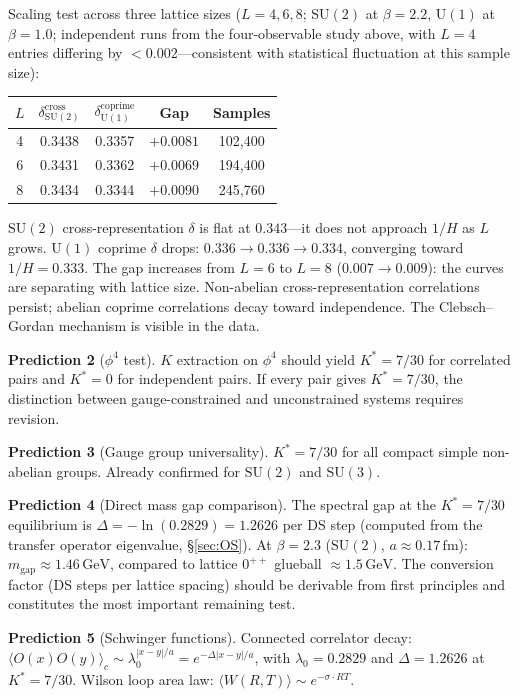 \documentclass[11pt,a4paper]{article}
\theoremstyle{definition}
\theoremstyle{remark}
\newcommand{\SU}{\mathrm{SU}}
\begin{document}
Scaling test across three lattice sizes ($L=4,6,8$; $\SU(2)$ at $\beta=2.2$, $\mathrm{U}(1)$ at $\beta=1.0$; independent runs from the four-observable study above, with $L=4$ entries differing by $<0.002$---consistent with statistical fluctuation at this sample size):

\begin{center}
\begin{tabular}{ccccc}
\toprule
$L$ & $\delta_{\SU(2)}^{\mathrm{cross}}$ & $\delta_{\mathrm{U}(1)}^{\mathrm{coprime}}$ & Gap & Samples \\
\midrule
4 & 0.3438 & 0.3357 & $+0.0081$ & 102{,}400 \\
6 & 0.3431 & 0.3362 & $+0.0069$ & 194{,}400 \\
8 & 0.3434 & 0.3344 & $+0.0090$ & 245{,}760 \\
\bottomrule
\end{tabular}
\end{center}

$\SU(2)$ cross-representation $\delta$ is flat at $0.343$---it does not approach $1/H$ as $L$ grows. $\mathrm{U}(1)$ coprime $\delta$ drops: $0.336\to 0.336\to 0.334$, converging toward $1/H=0.333$. The gap increases from $L=6$ to $L=8$ ($0.007\to 0.009$): the curves are separating with lattice size. Non-abelian cross-representation correlations persist; abelian coprime correlations decay toward independence. The Clebsch--Gordan mechanism is visible in the data.

\textbf{Prediction 2} ($\phi^4$ test). $K$ extraction on $\phi^4$ should yield $K^*=7/30$ for correlated pairs and $K^*=0$ for independent pairs. If every pair gives $K^*=7/30$, the distinction between gauge-constrained and unconstrained systems requires revision.

\textbf{Prediction 3} (Gauge group universality). $K^*=7/30$ for all compact simple non-abelian groups. Already confirmed for $\SU(2)$ and $\SU(3)$.

\textbf{Prediction 4} (Direct mass gap comparison). The spectral gap at the $K^*=7/30$ equilibrium is $\Delta=-\ln(0.2829)=1.2626$ per DS step (computed from the transfer operator eigenvalue, \S\ref{sec:OS}). At $\beta=2.3$ ($\SU(2)$, $a\approx 0.17\,\mathrm{fm}$): $m_{\mathrm{gap}}\approx 1.46\,\mathrm{GeV}$, compared to lattice $0^{++}$ glueball $\approx 1.5\,\mathrm{GeV}$. The conversion factor (DS steps per lattice spacing) should be derivable from first principles and constitutes the most important remaining test.

\textbf{Prediction 5} (Schwinger functions). Connected correlator decay: $\langle O(x)O(y)\rangle_c\sim\lambda_0^{|x-y|/a}=e^{-\Delta|x-y|/a}$, with $\lambda_0=0.2829$ and $\Delta=1.2626$ at $K^*=7/30$. Wilson loop area law: $\langle W(R,T)\rangle\sim e^{-\sigma\cdot RT}$.
\end{document}
